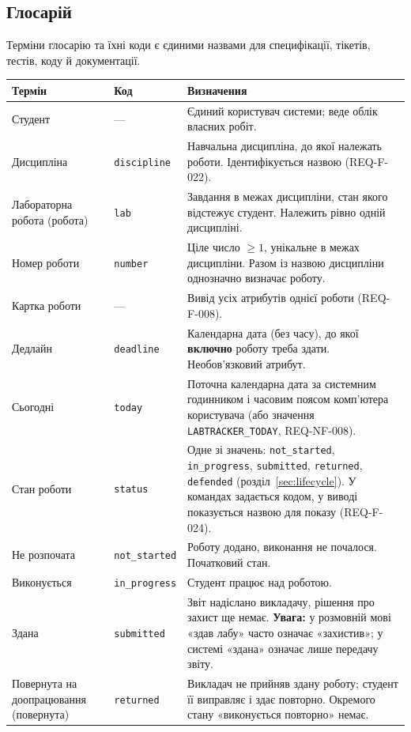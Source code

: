\documentclass[12pt,a4paper]{article}
\newcommand{\code}[1]{\texttt{#1}}
\begin{document}
\subsection{Глосарій}\label{sec:glossary}
Терміни глосарію та їхні коди є єдиними назвами для специфікації, тікетів, тестів, коду й документації.

\begin{longtable}{>{\raggedright}p{} >{\raggedright}p{} p{}}
\toprule
\textbf{Термін} & \textbf{Код} & \textbf{Визначення} \\
\midrule
\endhead
Студент & --- & Єдиний користувач системи; веде облік власних робіт. \\
Дисципліна & \code{discipline} & Навчальна дисципліна, до якої належать роботи. Ідентифікується назвою (REQ-F-022). \\
Лабораторна робота (робота) & \code{lab} & Завдання в межах дисципліни, стан якого відстежує студент. Належить рівно одній дисципліні. \\
Номер роботи & \code{number} & Ціле число $\ge 1$, унікальне в межах дисципліни. Разом із назвою дисципліни однозначно визначає роботу. \\
Картка роботи & --- & Вивід усіх атрибутів однієї роботи (REQ-F-008). \\
Дедлайн & \code{deadline} & Календарна дата (без часу), до якої \textbf{включно} роботу треба здати. Необов'язковий атрибут. \\
Сьогодні & \code{today} & Поточна календарна дата за системним годинником і часовим поясом комп'ютера користувача (або значення \code{LABTRACKER\_TODAY}, REQ-NF-008). \\
Стан роботи & \code{status} & Одне зі значень: \code{not\_started}, \code{in\_progress}, \code{submitted}, \code{returned}, \code{defended} (розділ~\ref{sec:lifecycle}). У командах задається кодом, у виводі показується назвою для показу (REQ-F-024). \\
Не розпочата & \code{not\_started} & Роботу додано, виконання не почалося. Початковий стан. \\
Виконується & \code{in\_progress} & Студент працює над роботою. \\
Здана & \code{submitted} & Звіт надіслано викладачу, рішення про захист ще немає. \textbf{Увага:} у розмовній мові «здав лабу» часто означає «захистив»; у системі «здана» означає лише передачу звіту. \\
Повернута на доопрацювання (повернута) & \code{returned} & Викладач не прийняв здану роботу; студент її виправляє і здає повторно. Окремого стану «виконується повторно» немає. \\

\end{longtable}
\end{document}
